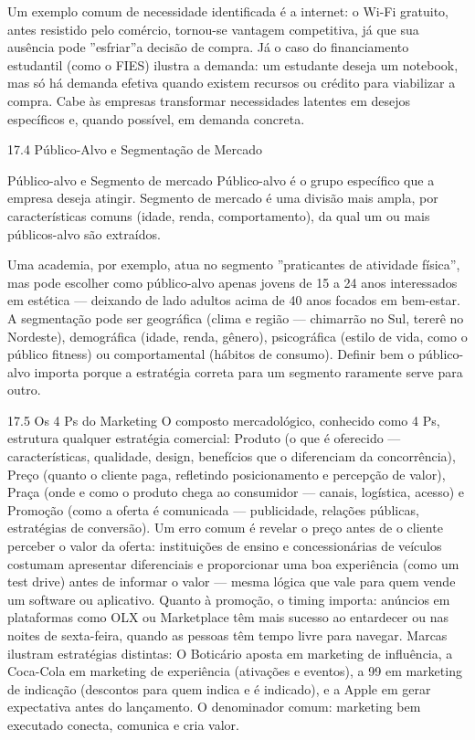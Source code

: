 Um exemplo comum de necessidade identificada é a internet: o Wi-Fi gratuito, antes resistido pelo comércio, tornou-se vantagem competitiva, já que sua ausência pode ”esfriar”a decisão de compra. Já o caso do financiamento estudantil (como o FIES) ilustra a demanda: um estudante deseja um notebook, mas só há demanda efetiva quando existem recursos ou crédito para viabilizar a compra. Cabe às empresas transformar necessidades latentes em desejos específicos e, quando possível, em demanda concreta.

17.4 Público-Alvo e Segmentação de Mercado

Público-alvo e Segmento de mercado Público-alvo é o grupo específico que a empresa deseja atingir. Segmento de mercado é uma divisão mais ampla, por características comuns (idade, renda, comportamento), da qual um ou mais públicos-alvo são extraídos.

Uma academia, por exemplo, atua no segmento ”praticantes de atividade física”, mas pode escolher como público-alvo apenas jovens de 15 a 24 anos interessados em estética — deixando de lado adultos acima de 40 anos focados em bem-estar. A segmentação pode ser geográfica (clima e região — chimarrão no Sul, tererê no Nordeste), demográfica (idade, renda, gênero), psicográfica (estilo de vida, como o público fitness) ou comportamental (hábitos de consumo). Definir bem o público-alvo importa porque a estratégia correta para um segmento raramente serve para outro.

17.5 Os 4 Ps do Marketing O composto mercadológico, conhecido como 4 Ps, estrutura qualquer estratégia comercial: Produto (o que é oferecido — características, qualidade, design, benefícios que o diferenciam da concorrência), Preço (quanto o cliente paga, refletindo posicionamento e percepção de valor), Praça (onde e como o produto chega ao consumidor — canais, logística, acesso) e Promoção (como a oferta é comunicada — publicidade, relações públicas, estratégias de conversão). Um erro comum é revelar o preço antes de o cliente perceber o valor da oferta: instituições de ensino e concessionárias de veículos costumam apresentar diferenciais e proporcionar uma boa experiência (como um test drive) antes de informar o valor — mesma lógica que vale para quem vende um software ou aplicativo. Quanto à promoção, o timing importa: anúncios em plataformas como OLX ou Marketplace têm mais sucesso ao entardecer ou nas noites de sexta-feira, quando as pessoas têm tempo livre para navegar. Marcas ilustram estratégias distintas: O Boticário aposta em marketing de influência, a Coca-Cola em marketing de experiência (ativações e eventos), a 99 em marketing de indicação (descontos para quem indica e é indicado), e a Apple em gerar expectativa antes do lançamento. O denominador comum: marketing bem executado conecta, comunica e cria valor.

